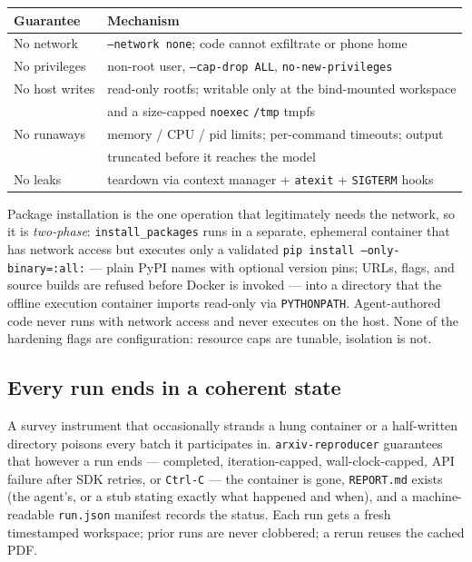 \documentclass[10pt]{article}
\newcommand{\system}{\texttt{arxiv-reproducer}}
\begin{document}
\begin{center}
\begin{tabular}{@{}ll@{}}
\toprule
\textbf{Guarantee} & \textbf{Mechanism} \\
\midrule
No network & \texttt{--network none}; code cannot exfiltrate or phone home \\
No privileges & non-root user, \texttt{--cap-drop ALL}, \texttt{no-new-privileges} \\
No host writes & read-only rootfs; writable only at the bind-mounted workspace \\
 & and a size-capped \texttt{noexec} \texttt{/tmp} tmpfs \\
No runaways & memory / CPU / pid limits; per-command timeouts; output \\
 & truncated before it reaches the model \\
No leaks & teardown via context manager + \texttt{atexit} + \texttt{SIGTERM} hooks \\
\bottomrule
\end{tabular}
\end{center}

Package installation is the one operation that legitimately needs the network, so it is \emph{two-phase}: \texttt{install\_packages} runs in a separate, ephemeral container that has network access but executes only a validated \texttt{pip install --only-binary=:all:} --- plain PyPI names with optional version pins; URLs, flags, and source builds are refused before Docker is invoked --- into a directory that the offline execution container imports read-only via \texttt{PYTHONPATH}. Agent-authored code never runs with network access and never executes on the host. None of the hardening flags are configuration: resource caps are tunable, isolation is not.

\subsection{Every run ends in a coherent state}

A survey instrument that occasionally strands a hung container or a half-written directory poisons every batch it participates in. \system{} guarantees that however a run ends --- completed, iteration-capped, wall-clock-capped, API failure after SDK retries, or \texttt{Ctrl-C} --- the container is gone, \texttt{REPORT.md} exists (the agent's, or a stub stating exactly what happened and when), and a machine-readable \texttt{run.json} manifest records the status. Each run gets a fresh timestamped workspace; prior runs are never clobbered; a rerun reuses the cached PDF.
\end{document}
